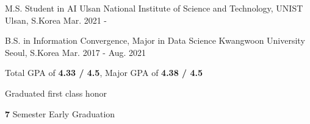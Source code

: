 

\begin{cventries}


\cventry
    {M.S. Student in AI} %
    {Ulsan National Institute of Science and Technology, UNIST} %
    {Ulsan, S.Korea} %
    {Mar. 2021 - } %
    {
      \begin{cvitems} %
      \end{cvitems}
    }

  \cventry
    {B.S. in Information Convergence, Major in Data Science} %
    {Kwangwoon University} %
    {Seoul, S.Korea} %
    {Mar. 2017 - Aug. 2021} %
    {
      \begin{cvitems} %
        \item {Total GPA of \textbf{4.33 / 4.5}, Major GPA of\textbf{ 4.38 / 4.5}}
        \item {Graduated first class honor}
        \item {\textbf{7} Semester Early Graduation}
      \end{cvitems}
    }

\end{cventries}
